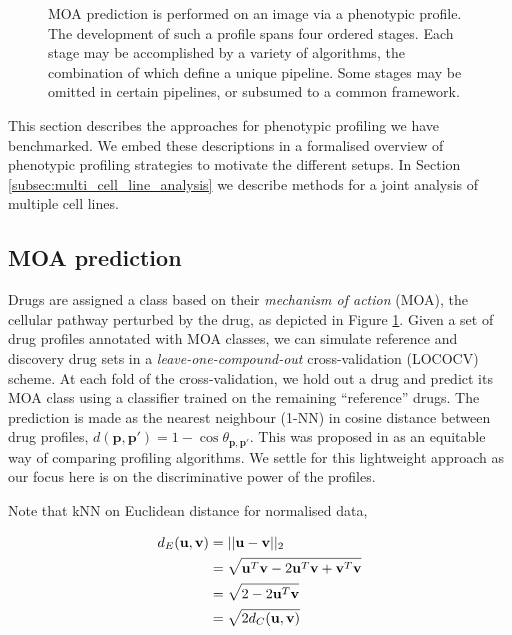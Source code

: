 \begin{figure}
\begin{tikzpicture}[x=0.75pt,y=0.75pt,yscale=-1.5,xscale=1.5]
\end{tikzpicture}

\caption{MOA prediction is performed on an image via a phenotypic profile. The development of such a profile spans four ordered stages. Each stage may be accomplished by a variety of algorithms, the combination of which define a unique pipeline. Some stages may be omitted in certain pipelines, or subsumed to a common framework.}
\label{fig:profiling}
\end{figure}

This section describes the approaches for phenotypic profiling we have benchmarked. We embed these descriptions in a formalised overview of phenotypic profiling strategies to motivate the different setups. In Section \ref{subsec:multi_cell_line_analysis} we describe methods for a joint analysis of multiple cell lines.

\subsection{MOA prediction}
\label{subsec:moa_prediction}

Drugs are assigned a class based on their \emph{mechanism of action} (MOA), the cellular pathway perturbed by the drug, as depicted in Figure \ref{fig:profiling}. Given a set of drug profiles annotated with MOA classes, we can simulate reference and discovery drug sets in a \emph{leave-one-compound-out} cross-validation (LOCOCV) scheme. At each fold of the cross-validation, we hold out a drug and predict its MOA class using a classifier trained on the remaining ``reference'' drugs. The prediction is made as the nearest neighbour (1-NN) in cosine distance between drug profiles, $d(\mathbf{p}, \mathbf{p}') = 1 - \cos\theta_{\mathbf{p}, \mathbf{p}'}$. This was proposed in \cite{ljosa2013comparison} as an equitable way of comparing profiling algorithms. We settle for this lightweight approach as our focus here is on the discriminative power of the profiles.

Note that kNN on Euclidean distance for normalised data,

\begin{align}d_E(\mathbf{u}, \mathbf{v}) &= ||\mathbf{u} - \mathbf{v}||_2 \notag \\
&= \sqrt{\mathbf{u}^T\mathbf{v} - 2\mathbf{u}^T\mathbf{v} + \mathbf{v}^T\mathbf{v}} \notag \\
&= \sqrt{2 - 2\mathbf{u}^T\mathbf{v}} \notag \\
&= \sqrt{2d_{C}(\mathbf{u}, \mathbf{v})} \notag
\end{align}

